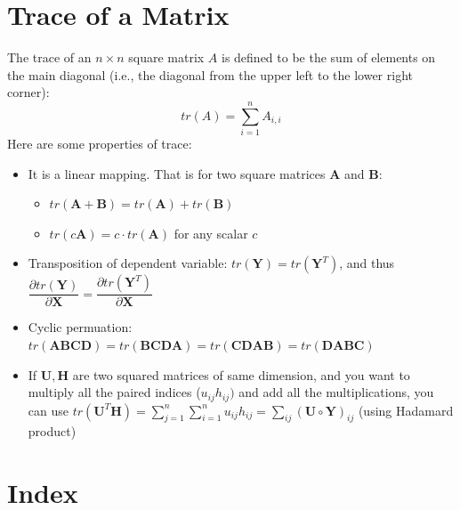 \documentclass[conference,final,11pt,technote,onecolumn]{IEEEtran}\usepackage[]{graphicx}\usepackage[]{color}
\begin{document}
\section{Trace of a Matrix}
\label{term:trace_of_a_matrix}
The trace of an $n\times n$ square matrix $A$ is defined to be the sum of elements on the main diagonal (i.e., the diagonal from the upper left to the lower right corner):
\[
tr(A) = \sum_{i=1}^nA_{i,i}
\]
Here are some properties of trace:
\begin{itemize}
	\item It is a linear mapping. That is for two square matrices $\mathbf{A}$ and $\mathbf{B}$: 
		\begin{itemize}
			\item $tr(\mathbf{A}+\mathbf{B}) = tr(\mathbf{A}) + tr(\mathbf{B})$
			\item $tr(c\mathbf{A}) = c\cdot tr(\mathbf{A})$ for any scalar $c$
		\end{itemize}
	\item Transposition of dependent variable: $tr(\mathbf{Y}) = tr(\mathbf{Y}^T)$, and thus $\dfrac{\partial tr(\mathbf{Y})}{\partial \mathbf{X}} = \dfrac{\partial tr(\mathbf{Y}^T)}{\partial \mathbf{X}}$
	\item Cyclic permuation: $tr(\mathbf{ABCD}) = tr(\mathbf{BCDA}) = tr(\mathbf{CDAB}) = tr(\mathbf{DABC})$
	\item If $\mathbf{U}, \mathbf{H}$ are two squared matrices of same dimension, and you want to multiply all the paired indices ($u_{ij}h_{ij})$ and add all the multiplications, you can use $tr({\mathbf{U}^T\mathbf{H}}) = \sum_{j=1}^n\sum_{i=1}^nu_{ij}h_{ij} = \sum_{ij}(\mathbf{U}\circ \mathbf{Y})_{ij}$ (using Hadamard product)
\end{itemize}

	
	
	\pagebreak
	\section*{Index}
	\printindex
	
\end{document}

